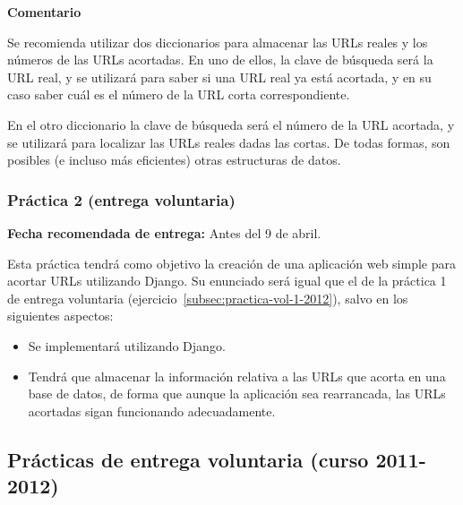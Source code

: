 \textbf{Comentario}

Se recomienda utilizar dos diccionarios para almacenar las URLs reales y los números de las URLs acortadas. En uno de ellos, la clave de búsqueda será la URL real, y se utilizará para saber si una URL real ya está acortada, y en su caso saber cuál es el número de la URL corta correspondiente.

En el otro diccionario la clave de búsqueda será el número de la URL acortada, y se utilizará para localizar las URLs reales dadas las cortas. De todas formas, son posibles (e incluso más eficientes) otras estructuras de datos.

\subsubsection{Práctica 2 (entrega voluntaria)}
\label{subsec:practica-vol-2-2012}

\textbf{Fecha recomendada de entrega:} Antes del 9 de abril.

Esta práctica tendrá como objetivo la creación de una aplicación web simple para acortar URLs utilizando Django. Su enunciado será igual que el de la práctica 1 de entrega voluntaria (ejercicio~\ref{subsec:practica-vol-1-2012}), salvo en los siguientes aspectos:

\begin{itemize}
\item Se implementará utilizando Django.
\item Tendrá que almacenar la información relativa a las URLs que acorta en una base de datos, de forma que aunque la aplicación sea rearrancada, las URLs acortadas sigan funcionando adecuadamente.
\end{itemize}


\subsection{Prácticas de entrega voluntaria (curso 2011-2012)}

